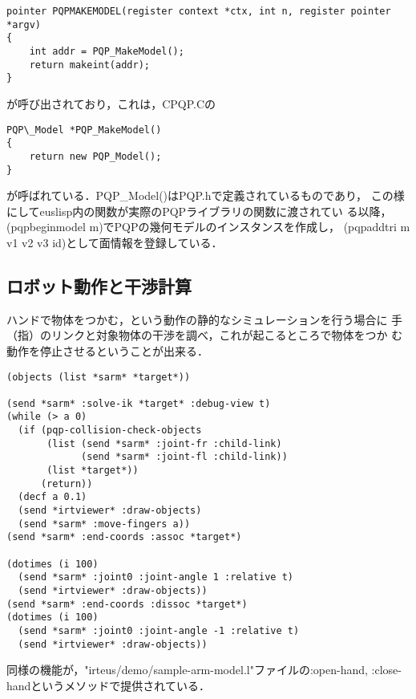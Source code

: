 {\baselineskip=10pt
\begin{verbatim}
pointer PQPMAKEMODEL(register context *ctx, int n, register pointer *argv)
{
    int addr = PQP_MakeModel();
    return makeint(addr);
}
\end{verbatim}
}

が呼び出されており，これは，CPQP.Cの
{\baselineskip=10pt
\begin{verbatim}
PQP\_Model *PQP_MakeModel()
{
    return new PQP_Model();
}
\end{verbatim}
}
が呼ばれている．PQP\_Model()はPQP.hで定義されているものであり，
この様にしてeuslisp内の関数が実際のPQPライブラリの関数に渡されてい
る以降，(pqpbeginmodel m)でPQPの幾何モデルのインスタンスを作成し，
(pqpaddtri m v1 v2 v3 id)として面情報を登録している．

\subsection{ロボット動作と干渉計算}

ハンドで物体をつかむ，という動作の静的なシミュレーションを行う場合に
手（指）のリンクと対象物体の干渉を調べ，これが起こるところで物体をつか
む動作を停止させるということが出来る．

{\baselineskip=10pt
\begin{verbatim}
(objects (list *sarm* *target*))

(send *sarm* :solve-ik *target* :debug-view t)
(while (> a 0)
  (if (pqp-collision-check-objects
       (list (send *sarm* :joint-fr :child-link)
             (send *sarm* :joint-fl :child-link))
       (list *target*))
      (return))
  (decf a 0.1)
  (send *irtviewer* :draw-objects)
  (send *sarm* :move-fingers a))
(send *sarm* :end-coords :assoc *target*)

(dotimes (i 100)
  (send *sarm* :joint0 :joint-angle 1 :relative t)
  (send *irtviewer* :draw-objects))
(send *sarm* :end-coords :dissoc *target*)
(dotimes (i 100)
  (send *sarm* :joint0 :joint-angle -1 :relative t)
  (send *irtviewer* :draw-objects))
\end{verbatim}
}

同様の機能が，"irteus/demo/sample-arm-model.l"ファイルの:open-hand,
:close-handというメソッドで提供されている．

 

